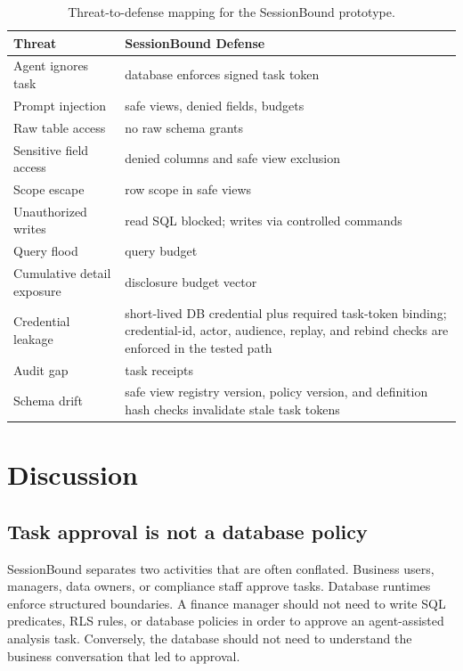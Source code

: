 \documentclass[journal]{IEEEtran}
\begin{document}
\begin{table}[!t]
\centering
\small
\setlength{\tabcolsep}{3pt}
\caption{Threat-to-defense mapping for the SessionBound prototype.}
\label{tab:threat-defense}
\begin{tabular}{@{}
  >{\raggedright\arraybackslash}p{}
  >{\raggedright\arraybackslash}p{}@{}}
\toprule
Threat & SessionBound Defense \\
\midrule
Agent ignores task & database enforces signed task token \\
Prompt injection & safe views, denied fields, budgets \\
Raw table access & no raw schema grants \\
Sensitive field access & denied columns and safe view exclusion \\
Scope escape & row scope in safe views \\
Unauthorized writes & read SQL blocked; writes via controlled commands \\
Query flood & query budget \\
Cumulative detail exposure & disclosure budget vector \\
Credential leakage & short-lived DB credential plus required task-token binding; credential-id, actor, audience, replay, and rebind checks are enforced in the tested path \\
Audit gap & task receipts \\
Schema drift & safe view registry version, policy version, and definition hash checks invalidate stale task tokens \\
\bottomrule
\end{tabular}
\end{table}


\hypertarget{discussion}{%
\section{Discussion}\label{discussion}}

\hypertarget{task-approval-is-not-a-database-policy}{%
\subsection{Task approval is not a database
policy}\label{task-approval-is-not-a-database-policy}}

SessionBound separates two activities that are often conflated.
Business users, managers, data owners, or compliance staff approve
tasks. Database runtimes enforce structured boundaries. A finance
manager should not need to write SQL predicates, RLS rules, or database
policies in order to approve an agent-assisted analysis task.
Conversely, the database should not need to understand the business
conversation that led to approval.
\end{document}
